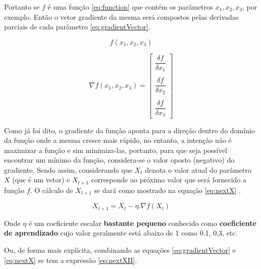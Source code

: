 \begin{apendicesenv}
		\par Portanto se $f$ é uma função \ref{eq:function}  que contém os parâmetros $x_1, x_2, x_3$, por exemplo. Então o vetor gradiente da mesma será compostos pelas derivadas parciais de cada parâmetro \ref{eq:gradientVector}.

		\begin{equation}\label{eq:function}
			f(x_1, x_2, x_3)
		\end{equation}

		\begin{equation}\label{eq:gradientVector}
			\nabla f(x_1, x_2, x_3) = \begin{bmatrix}
				\dfrac{\delta f}{\delta x_1}  \\\\
				\dfrac{\delta f}{\delta x_2}  \\\\
				\dfrac{\delta f}{\delta x_3} 
			\end{bmatrix}
		\end{equation}
	
		\par Como já foi dito, o gradiente da função aponta para a direção dentro do domínio da função onde a mesma cresce mais rápido, no entanto, a intenção não é maximizar a função e sim minimiza-las, portanto, para que seja possível encontrar um mínimo da função, considera-se o valor oposto (negativo) do gradiente. Sendo assim, considerando que $X_t$ denota o valor atual  do parâmetro $X$ (que é um vetor) e  $X_{t+1}$ corresponde ao próximo valor que será fornecido a função $f$. O cálculo de $X_{t+1}$ se dará como mostrado na equação \ref{eq:nextX} .
	
			\begin{equation}\label{eq:nextX}
				X_{t+1} = X_t  - \eta . \nabla f(X_t)
			\end{equation}
	
			\par Onde $\eta$ é um coeficiente escalar \textbf{bastante pequeno} conhecido como \textbf{coeficiente de aprendizado} cujo valor geralmente está abaixo de 1 como 0.1, 0,3, etc.
			
			\par Ou, de forma mais explícita, combinando as equações \ref{eq:gradientVector} e \ref{eq:nextX} se tem a expressão \ref{eq:nextXII}.
			

\end{apendicesenv}
